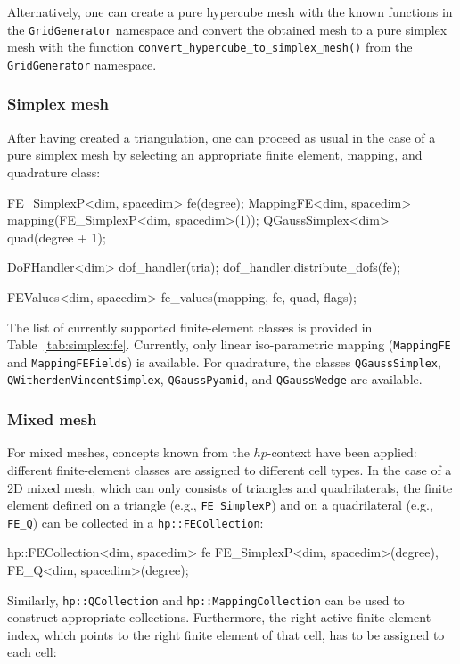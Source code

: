 \documentclass{ansarticle-preprint}
\begin{document}
Alternatively, one can create a pure hypercube mesh with the known functions
in the \texttt{GridGenerator} namespace and convert the obtained mesh to a
pure simplex mesh with the function
\texttt{convert\_\allowbreak hypercube\_\allowbreak to\_\allowbreak simplex\_\allowbreak mesh()} from the \texttt{GridGenerator} namespace.

\subsubsection{Simplex mesh}

After having created a triangulation, one can proceed as usual in the case of
a pure simplex mesh by selecting an appropriate finite element, mapping, and
quadrature class:

\begin{c++}
FE_SimplexP<dim, spacedim> fe(degree);
MappingFE<dim, spacedim> mapping(FE_SimplexP<dim, spacedim>(1));
QGaussSimplex<dim> quad(degree + 1);

DoFHandler<dim> dof_handler(tria);
dof_handler.distribute_dofs(fe);

FEValues<dim, spacedim> fe_values(mapping, fe, quad, flags);
\end{c++}
The  list of currently supported finite-element classes is provided in Table~\ref{tab:simplex:fe}. Currently,
only linear iso-parametric mapping (\texttt{MappingFE} and \texttt{MappingFEFields}) is available. For quadrature, the classes \texttt{QGaussSimplex}, \texttt{QWitherdenVincentSimplex},
\texttt{QGaussPyamid}, and \texttt{QGaussWedge} are
available.

\subsubsection{Mixed mesh}
For mixed meshes, concepts known from the $hp$-context have been applied:
 different finite-element classes are assigned to different cell types. In the
case of a 2D mixed mesh, which can only consists of triangles and
quadrilaterals, the finite element defined on a triangle (e.g., \texttt{FE\_SimplexP})
and on a quadrilateral (e.g., \texttt{FE\_Q}) can be collected in a \texttt{hp::FECollection}:

\begin{c++}
hp::FECollection<dim, spacedim> fe
  {FE_SimplexP<dim, spacedim>(degree), FE_Q<dim, spacedim>(degree)};
\end{c++}

Similarly, \texttt{hp::QCollection} and \texttt{hp::MappingCollection} can be used
to construct appropriate collections. Furthermore, the right active finite-element index, which points to the right
finite element of that cell, has to be assigned to each cell:
\end{document}
